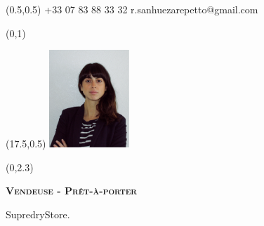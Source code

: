 \documentclass[30pt, french]{tccv}
\begin{document}
\begin{upshape}
\fontsize{9pt}{1em}\color{text}\selectfont



%
%




\begin{textblock}{6.5}(0.5,0.5)
    {+33 07 83 88 33 32}
    {r.sanhuezarepetto@gmail.com}
\end{textblock}

\begin{textblock}{21}(0,1)
\end{textblock}

\begin{textblock}{21}(17.5,0.5)
		\includegraphics[width=3cm]{../Figure/Rocio3.png}
\end{textblock}  



\begin{textblock}{21}(0,2.3)

\begin{center}
\fontsize{10pt}{1.5em}\color{text}\bodyfontlight\upshape\selectfont

	{\fontsize{14pt}{5em}\scshape\bfseries Vendeuse - Prêt-à-porter  \\} 

	\vspace{5pt}
SupredryStore. 			\\
\end{center}
\end{textblock}  





%
%





\end{upshape}
\end{document}
